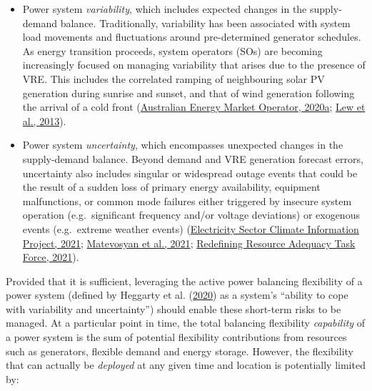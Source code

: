\documentclass[12pt,a4paper,]{report}
\providecommand{\tightlist}{%
  \setlength{\itemsep}{0pt}\setlength{\parskip}{0pt}}
\begin{document}
\begin{itemize}
\tightlist
\item
  Power system \emph{variability}, which includes expected changes in
  the supply-demand balance. Traditionally, variability has been
  associated with system load movements and fluctuations around
  pre-determined generator schedules. As energy transition proceeds,
  system operators (SOs) are becoming increasingly focused on managing
  variability that arises due to the presence of VRE. This includes the
  correlated ramping of neighbouring solar PV generation during sunrise
  and sunset, and that of wind generation following the arrival of a
  cold front
  (\protect\hyperlink{ref-australianenergymarketoperatorRenewableIntegrationStudy2020}{Australian
  Energy Market Operator, 2020a};
  \protect\hyperlink{ref-lewWesternWindSolar2013}{Lew et al., 2013}).
\item
  Power system \emph{uncertainty}, which encompasses unexpected changes
  in the supply-demand balance. Beyond demand and VRE generation
  forecast errors, uncertainty also includes singular or widespread
  outage events that could be the result of a sudden loss of primary
  energy availability, equipment malfunctions, or common mode failures
  either triggered by insecure system operation (e.g.~significant
  frequency and/or voltage deviations) or exogenous events (e.g.~extreme
  weather events)
  (\protect\hyperlink{ref-electricitysectorclimateinformationprojectESCIProjectFinal2021}{Electricity
  Sector Climate Information Project, 2021};
  \protect\hyperlink{ref-matevosyanFutureInverterBasedResources2021}{Matevosyan
  et al., 2021};
  \protect\hyperlink{ref-redefiningresourceadequacytaskforceRedefiningResourceAdequacy2021}{Redefining
  Resource Adequacy Task Force, 2021}).
\end{itemize}

Provided that it is sufficient, leveraging the active power balancing
flexibility of a power system (defined by Heggarty et al.
(\protect\hyperlink{ref-heggartyQuantifyingPowerSystem2020}{2020}) as a
system's ``ability to cope with variability and uncertainty'') should
enable these short-term risks to be managed. At a particular point in
time, the total balancing flexibility \emph{capability} of a power
system is the sum of potential flexibility contributions from resources
such as generators, flexible demand and energy storage. However, the
flexibility that can actually be \emph{deployed} at any given time and
location is potentially limited by:
\end{document}
